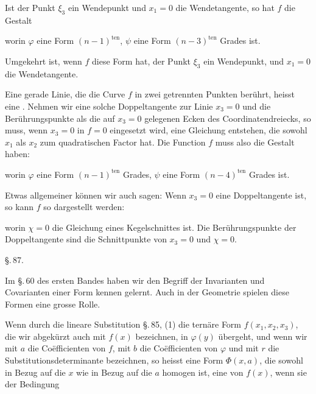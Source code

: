 Ist der Punkt $\xi_3$ ein Wendepunkt und $x_1 = 0$ die Wendetangente, so hat $f$ die Gestalt

worin $\varphi$ eine Form $(n-1)^{\text{ten}}$, $\psi$ eine Form $(n-3)^{\text{ten}}$ Grades ist.

Umgekehrt ist, wenn $f$ diese Form hat, der Punkt $\xi_3$ ein Wendepunkt, und $x_1 = 0$ die Wendetangente.

Eine gerade Linie, die die Curve $f$ in zwei getrennten Punkten berührt, heisst eine . Nehmen wir eine solche Doppeltangente zur Linie $x_3 = 0$ und die Berührungspunkte als die auf $x_3 = 0$ gelegenen Ecken des Coordinatendreiecks, so muss, wenn $x_3 = 0$ in $f = 0$ eingesetzt wird, eine Gleichung entstehen, die sowohl $x_1$ als $x_2$ zum quadratischen Factor hat. Die Function $f$ muss also die Gestalt haben:

worin $\varphi$ eine Form $(n-1)^{\text{ten}}$ Grades, $\psi$ eine Form $(n-4)^{\text{ten}}$ Grades ist.

Etwas allgemeiner können wir auch sagen: Wenn $x_3 = 0$ eine Doppeltangente ist, so kann $f$ so dargestellt werden:

worin $\chi = 0$ die Gleichung eines Kegelschnittes ist. Die Berührungspunkte der Doppeltangente sind die Schnittpunkte von $x_3 = 0$ und $\chi = 0$.

\begin{center}
\S.\,87.

\end{center}

Im \S.\,60 des ersten Bandes haben wir den Begriff der Invarianten und Covarianten einer Form kennen gelernt. Auch in der Geometrie spielen diese Formen eine grosse Rolle.

Wenn durch die lineare Substitution \S.\,85, (1) die ternäre Form $f(x_1, x_2, x_3)$, die wir abgekürzt auch mit $f(x)$ bezeichnen, in $\varphi(y)$ übergeht, und wenn wir mit $a$ die Coëfficienten von $f$, mit $b$ die Coëfficienten von $\varphi$ und mit $r$ die Substitutionsdeterminante bezeichnen, so heisst eine Form $\Phi(x, a)$, die sowohl in Bezug auf die $x$ wie in Bezug auf die $a$ homogen ist, eine  von $f(x)$, wenn sie der Bedingung

